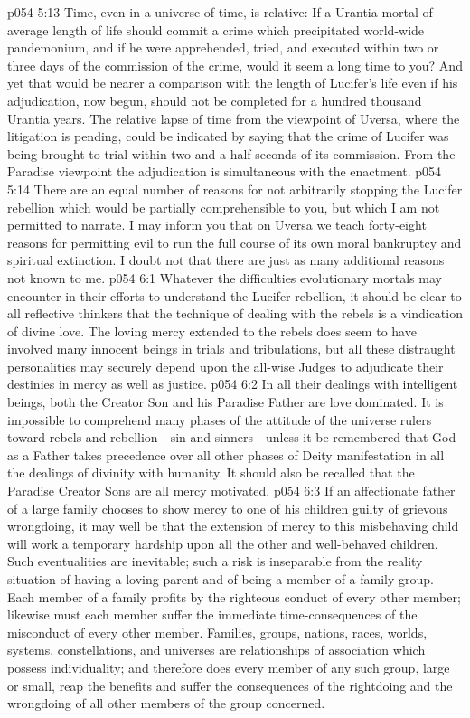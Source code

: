 \pc \vs p054 5:13 \bibnobreakspace Time, even in a universe of time, is relative: If a Urantia mortal of average length of life should commit a crime which precipitated world\hyp{}wide pandemonium, and if he were apprehended, tried, and executed within two or three days of the commission of the crime, would it seem a long time to you? And yet that would be nearer a comparison with the length of Lucifer’s life even if his adjudication, now begun, should not be completed for a hundred thousand Urantia years. The relative lapse of time from the viewpoint of Uversa, where the litigation is pending, could be indicated by saying that the crime of Lucifer was being brought to trial within two and a half seconds of its commission. From the Paradise viewpoint the adjudication is simultaneous with the enactment.
\pc \vs p054 5:14 There are an equal number of reasons for not arbitrarily stopping the Lucifer rebellion which would be partially comprehensible to you, but which I am not permitted to narrate. I may inform you that on Uversa we teach forty\hyp{}eight reasons for permitting evil to run the full course of its own moral bankruptcy and spiritual extinction. I doubt not that there are just as many additional reasons not known to me.
\vs p054 6:1 Whatever the difficulties evolutionary mortals may encounter in their efforts to understand the Lucifer rebellion, it should be clear to all reflective thinkers that the technique of dealing with the rebels is a vindication of divine love. The loving mercy extended to the rebels does seem to have involved many innocent beings in trials and tribulations, but all these distraught personalities may securely depend upon the all\hyp{}wise Judges to adjudicate their destinies in mercy as well as justice.
\vs p054 6:2 In all their dealings with intelligent beings, both the Creator Son and his Paradise Father are love dominated. It is impossible to comprehend many phases of the attitude of the universe rulers toward rebels and rebellion---sin and sinners---unless it be remembered that God as a Father takes precedence over all other phases of Deity manifestation in all the dealings of divinity with humanity. It should also be recalled that the Paradise Creator Sons are all mercy motivated.
\pc \vs p054 6:3 If an affectionate father of a large family chooses to show mercy to one of his children guilty of grievous wrongdoing, it may well be that the extension of mercy to this misbehaving child will work a temporary hardship upon all the other and well\hyp{}behaved children. Such eventualities are inevitable; such a risk is inseparable from the reality situation of having a loving parent and of being a member of a family group. Each member of a family profits by the righteous conduct of every other member; likewise must each member suffer the immediate time\hyp{}consequences of the misconduct of every other member. Families, groups, nations, races, worlds, systems, constellations, and universes are relationships of association which possess individuality; and therefore does every member of any such group, large or small, reap the benefits and suffer the consequences of the rightdoing and the wrongdoing of all other members of the group concerned.
